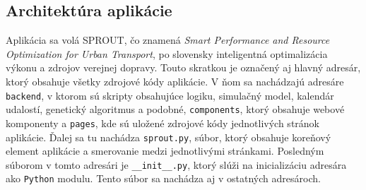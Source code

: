 \subsection*{Architektúra aplikácie}
Aplikácia sa volá SPROUT, čo znamená \textit{Smart Performance and Resource Optimization for Urban Transport}, po slovensky inteligentná optimalizácia výkonu a zdrojov verejnej dopravy.
Touto skratkou je označený aj hlavný adresár, ktorý obsahuje všetky zdrojové kódy aplikácie.
V ňom sa nachádzajú adresáre \texttt{backend}, v ktorom sú skripty obsahujúce logiku, simulačný model, kalendár udalostí, genetický algoritmus a podobné, \texttt{components}, ktorý obsahuje webové komponenty a \texttt{pages}, kde sú uložené zdrojové kódy jednotlivých stránok aplikácie.
Ďalej sa tu nachádza \texttt{sprout.py}, súbor, ktorý obsahuje koreňový element aplikácie a smerovanie medzi jednotlivými stránkami.
Posledným súborom v tomto adresári je \texttt{\_\_init\_\_.py}, ktorý slúži na inicializáciu adresára ako \texttt{Python} modulu.
Tento súbor sa nachádza aj v ostatných adresároch.


\newpage

